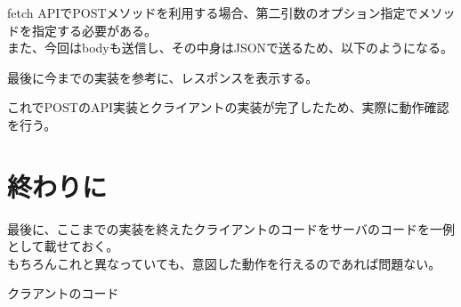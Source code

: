 fetch
APIでPOSTメソッドを利用する場合、第二引数のオプション指定でメソッドを指定する必要がある。\\
また、今回はbodyも送信し、その中身はJSONで送るため、以下のようになる。

\begin{Shaded}
\begin{Highlighting}[]
      \OperatorTok{=}  \NormalTok{(}\OperatorTok{,}\NormalTok{\{}
        \OperatorTok{:} \OperatorTok{,}
        \OperatorTok{:}\NormalTok{ \{}\OperatorTok{:} \NormalTok{\}}\OperatorTok{,}
        \OperatorTok{:} \NormalTok{(\{}\OperatorTok{:}
\NormalTok{      \})}\OperatorTok{;}
\end{Highlighting}
\end{Shaded}

最後に今までの実装を参考に、レスポンスを表示する。

これでPOSTのAPI実装とクライアントの実装が完了したため、実際に動作確認を行う。

\section{終わりに}\label{ux7d42ux308fux308aux306b}

最後に、ここまでの実装を終えたクライアントのコードをサーバのコードを一例として載せておく。\\
もちろんこれと異なっていても、意図した動作を行えるのであれば問題ない。

クラアントのコード

